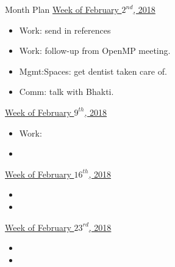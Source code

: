

\begin{frame} 
\begin{block}{Month Plan}
\underline{Week of February $2^{nd}$, 2018}
\begin{itemize}
\tiny \item \tiny Work: send in references 
\item \tiny Work: follow-up from OpenMP meeting. 
\item \tiny Mgmt:Spaces: get dentist taken care of. 
\item \tiny Comm: talk with Bhakti. 
\end{itemize}
\underline{Week of February $9^{th}$, 2018}
\begin{itemize}
\tiny \item \tiny Work:
\item \tiny
\end{itemize}
\underline{Week of February $16^{th}$, 2018}
\begin{itemize}
\tiny \item \tiny
\item \tiny
\end{itemize}
\underline{Week of February $23^{rd}$, 2018}
\begin{itemize}
\tiny \item \tiny
\item \tiny
\end{itemize}
\end{block}
\end{frame} 

